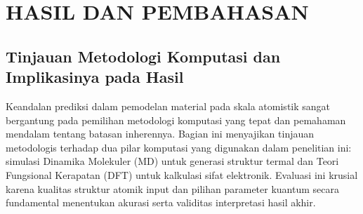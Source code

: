 
\newpage
\renewcommand{\thechapter}{\Roman{chapter}}
\chapter{HASIL DAN PEMBAHASAN}
\renewcommand{\thechapter}{\arabic{chapter}}

\section{Tinjauan Metodologi Komputasi dan Implikasinya pada Hasil}
\label{sec:metodologi_kritis}
Keandalan prediksi dalam pemodelan material pada skala atomistik sangat bergantung pada pemilihan metodologi komputasi yang tepat dan pemahaman mendalam tentang batasan inherennya.
Bagian ini menyajikan tinjauan metodologis terhadap dua pilar komputasi yang digunakan dalam penelitian ini: simulasi Dinamika Molekuler (MD) untuk generasi struktur termal dan Teori Fungsional Kerapatan (DFT) untuk kalkulasi sifat elektronik.
Evaluasi ini krusial karena kualitas struktur atomik input dan pilihan parameter kuantum secara fundamental menentukan akurasi serta validitas interpretasi hasil akhir.
